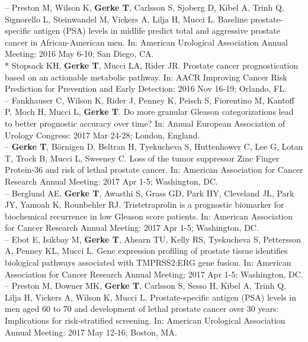 \documentclass[11pt, a4paper]{article} %
\begin{document}
-- Preston M, Wilson K, {\bf Gerke T}, Carlsson S, Sjoberg D, Kibel A, Trinh Q, Signorello L, Steinwandel M, Vickers A, Lilja H, Mucci L. Baseline prostate-specific antigen (PSA) levels in midlife predict total and aggressive prostate cancer in African-American men. In: American Urological Association Annual Meeting: 2016 May 6-10; San Diego, CA.\\

* Stopsack KH, {\bf Gerke T}, Mucci LA, Rider JR. Prostate cancer prognostication based on an actionable metabolic pathway. In: AACR Improving Cancer Risk Prediction for Prevention and Early Detection: 2016 Nov 16-19; Orlando, FL.\\

-- Fankhauser C, Wilson K, Rider J, Penney K, Peisch S, Fiorentino M, Kantoff P, Moch H, Mucci L, {\bf Gerke T}. Do more granular Gleason categorizations lead to better prognostic accuracy over time? In: Annual European Association of Urology Congress: 2017 Mar 24-28; London, England.\\

-- {\bf Gerke T},  B\"{o}rnigen D, Beltran H, Tyekucheva S, Huttenhower C, Lee G, Lotan T, Trock B, Mucci L, Sweeney C. Loss of the tumor suppressor Zinc Finger Protein-36 and risk of lethal prostate cancer. In: American Association for Cancer Research Annual Meeting: 2017 Apr 1-5; Washington, DC.\\

-- Berglund AE, {\bf Gerke T}, Awasthi S, Grass GD, Park HY, Cleveland JL, Park JY, Yamoah K, Rounbehler RJ. Tristetraprolin is a prognostic biomarker for biochemical recurrence in low Gleason score patients. In: American Association for Cancer Research Annual Meeting: 2017 Apr 1-5; Washington, DC.\\

-- Ebot E, Isikbay M, {\bf Gerke T}, Ahearn TU, Kelly RS, Tyekucheva S, Pettersson A, Penney KL, Mucci L. Gene expression profiling of prostate tissue identifies biological pathways associated with TMPRSS2:ERG gene fusion. In: American Association for Cancer Research Annual Meeting: 2017 Apr 1-5; Washington, DC.\\

-- Preston M, Downer MK, {\bf Gerke T}, Carlsson S, Sesso H, Kibel A, Trinh Q, Lilja H, Vickers A, Wilson K, Mucci L. Prostate-specific antigen (PSA) levels in men aged 60 to 70 and development of lethal prostate cancer over 30 years: Implications for risk-stratified screening. In: American Urological Association Annual Meeting: 2017 May 12-16; Boston, MA.\\
\end{document}
